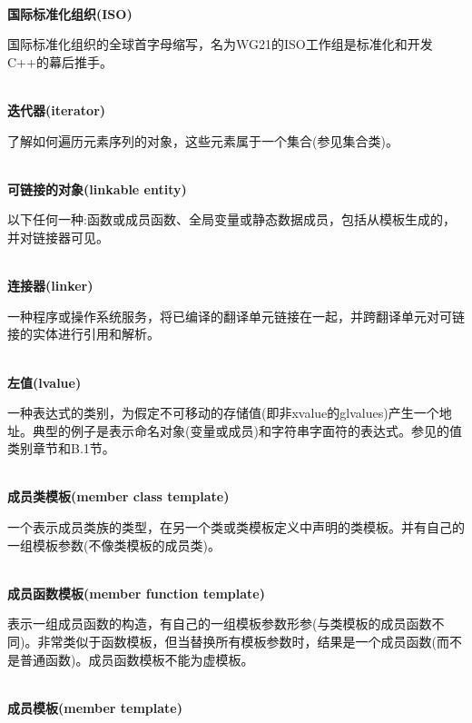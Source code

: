 \hspace*{\fill} \\ %
\noindent
\textbf{国际标准化组织(ISO)}

国际标准化组织的全球首字母缩写，名为WG21的ISO工作组是标准化和开发C++的幕后推手。

\hspace*{\fill} \\ %
\noindent
\textbf{迭代器(iterator)}

了解如何遍历元素序列的对象，这些元素属于一个集合(参见集合类)。

\hspace*{\fill} \\ %
\noindent
\textbf{可链接的对象(linkable entity)}

以下任何一种:函数或成员函数、全局变量或静态数据成员，包括从模板生成的，并对链接器可见。

\hspace*{\fill} \\ %
\noindent
\textbf{连接器(linker)}

一种程序或操作系统服务，将已编译的翻译单元链接在一起，并跨翻译单元对可链接的实体进行引用和解析。

\hspace*{\fill} \\ %
\noindent
\textbf{左值(lvalue)}

一种表达式的类别，为假定不可移动的存储值(即非xvalue的glvalues)产生一个地址。典型的例子是表示命名对象(变量或成员)和字符串字面符的表达式。参见的值类别章节和B.1节。

\hspace*{\fill} \\ %
\noindent
\textbf{成员类模板(member class template)}

一个表示成员类族的类型，在另一个类或类模板定义中声明的类模板。并有自己的一组模板参数(不像类模板的成员类)。

\hspace*{\fill} \\ %
\noindent
\textbf{成员函数模板(member function template)}

表示一组成员函数的构造，有自己的一组模板参数形参(与类模板的成员函数不同)。非常类似于函数模板，但当替换所有模板参数时，结果是一个成员函数(而不是普通函数)。成员函数模板不能为虚模板。

\hspace*{\fill} \\ %
\noindent
\textbf{成员模板(member template)}

